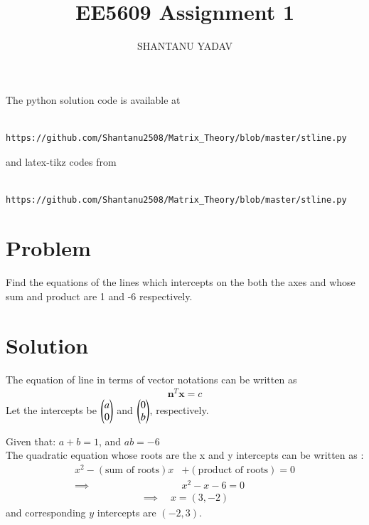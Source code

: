 \documentclass[journal,12pt,twocolumn]{IEEEtran}
\begin{document}
     \def\rightbox#1{\makebox[0in][r]{#1}}
     \def\centbox#1{\makebox[0in]{#1}}
     \def\topbox#1{\raisebox{-\baselineskip}[0in][0in]{#1}}
     \def\midbox#1{\raisebox{-0.5\baselineskip}[0in][0in]{#1}}
\vspace{3cm}
\title{EE5609 Assignment 1}
\author{SHANTANU YADAV }
\maketitle
\newpage
\bigskip
\renewcommand{\thefigure}{\theenumi}
\renewcommand{\thetable}{\theenumi}
The python solution code is available at
\begin{lstlisting}
       https://github.com/Shantanu2508/Matrix_Theory/blob/master/stline.py
\end{lstlisting}
%
and latex-tikz codes from 
\begin{lstlisting}
       https://github.com/Shantanu2508/Matrix_Theory/blob/master/stline.py
\end{lstlisting}
%
\section{Problem}
Find the equations of the lines which intercepts on the both the axes and whose sum and product are 1 and -6 respectively.

\section{Solution}
The equation of line in terms of vector notations can be written as
\begin{align}
	{\mathbf{n}^T}{\mathbf x} = c  
\end{align}
Let the intercepts be $\begin{pmatrix}a \\ 0\end{pmatrix}$ and $\begin{pmatrix}0 \\ b\end{pmatrix}$, respectively.

\noindent
Given that: \quad $ a + b = 1 $, \quad and \quad $ ab = -6$ \\
The quadratic equation whose roots are the x and y intercepts can be written 
as :
\begin{align}
	x^2 - (\text{sum of roots})x &+ (\text{product of roots}) = 0 \\
	\implies \qquad & x^2 - x -6 =0
\end{align}
\begin{align}
	\implies \quad x=(3,-2) 
\end{align}
and corresponding $y$ intercepts are $(-2,3)$. \\
\end{document}
